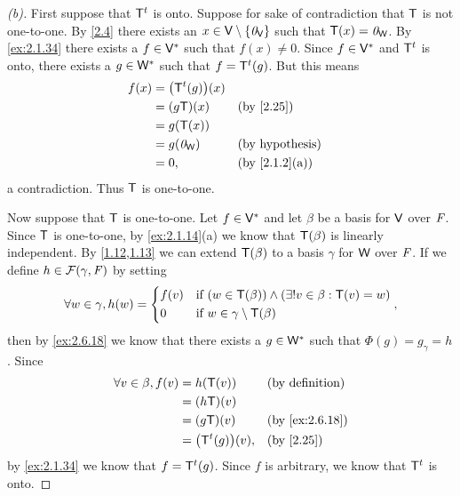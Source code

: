 \begin{proof}[(b)]
	First suppose that \({\mathsf{T}}^{t}\) is onto.
	Suppose for sake of contradiction that \(\mathsf{T}\) is not one-to-one.
	By \cref{2.4} there exists an \(x \in \mathsf{V} \setminus \left\lbrace\mathit{0}_{\mathsf{V}}\right\rbrace\) such that \(\mathsf{T}(x) = \mathit{0}_{\mathsf{W}}\).
	By \cref{ex:2.1.34} there exists a \(f \in \mathsf{V}^*\) such that \(f(x) \neq 0\).
	Since \(f \in \mathsf{V}^*\) and \({\mathsf{T}}^{t}\) is onto, there exists a \(g \in \mathsf{W}^*\) such that \(f = {\mathsf{T}}^{t}(g)\).
	But this means
	\begin{align*}
		f(x) & = \pa{\tp{\T}(g)}(x)                             \\
		     & = (g \T)(x)          &  & \by{2.25}              \\
		     & = g(\T(x))                                       \\
		     & = g(\zv_{\W})        &  & \text{(by hypothesis)} \\
		     & = 0,                 &  & \by{2.1.2}[a]
	\end{align*}
	a contradiction.
	Thus \(\mathsf{T}\) is one-to-one.

	Now suppose that \(\mathsf{T}\) is one-to-one.
	Let \(f \in \mathsf{V}^*\) and let \(\beta\) be a basis for \(\mathsf{V}\) over \(\mathit{F}\).
	Since \(\mathsf{T}\) is one-to-one, by \cref{ex:2.1.14}(a) we know that \(\mathsf{T}(\beta)\) is linearly independent.
	By \cref{1.12,1.13} we can extend \(\mathsf{T}(\beta)\) to a basis \(\gamma\) for \(\mathsf{W}\) over \(\mathit{F}\).
	If we define \(h \in \mathcal{F}(\gamma, \mathit{F})\) by setting
	\[
		\forall w \in \gamma, h(w) = \begin{dcases}
			f(v) & \text{if } (w \in \mathsf{T}(\beta)) \land (\exists! v \in \beta : \mathsf{T}(v) = w) \\
			0    & \text{if } w \in \gamma \setminus \mathsf{T}(\beta)
		\end{dcases},
	\]
	then by \cref{ex:2.6.18} we know that there exists a \(g \in \mathsf{W}^*\) such that \(\Phi(g) = g_{\gamma} = h\).
	Since
	\begin{align*}
		\forall v \in \beta, f(v) & = h(\T(v))            &  & \text{(by definition)} \\
		                          & = (h \T)(v)                                       \\
		                          & = (g \T)(v)           &  & \by{ex:2.6.18}         \\
		                          & = \pa{\tp{\T}(g)}(v), &  & \by{2.25}
	\end{align*}
	by \cref{ex:2.1.34} we know that \(f = {\mathsf{T}}^{t}(g)\).
	Since \(f\) is arbitrary, we know that \({\mathsf{T}}^{t}\) is onto.
\end{proof}
